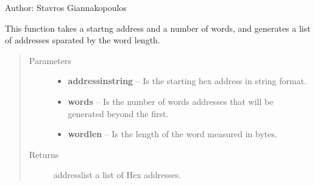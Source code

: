 \documentclass[letterpaper,10pt,english]{sphinxmanual}
\begin{document}
Author: Stavros Giannakopoulos

\begin{fulllineitems}
\label{Code:DataStrLeon.addresser}
This function takes a startng address and a number of words, and generates a list of addresses sparated by the word
length.
\begin{quote}\begin{description}
\item[{Parameters}] \leavevmode\begin{itemize}
\item {} 
\textbf{addressinstring} -- Is the starting hex address in string format.

\item {} 
\textbf{words} -- Is the number of words addresses that will be generated beyond the first.

\item {} 
\textbf{wordlen} -- Is the length of the word measured in bytes.

\end{itemize}

\item[{Returns}] \leavevmode
addresslist a list of Hex addresses.

\end{description}\end{quote}

\end{fulllineitems}

\end{document}
